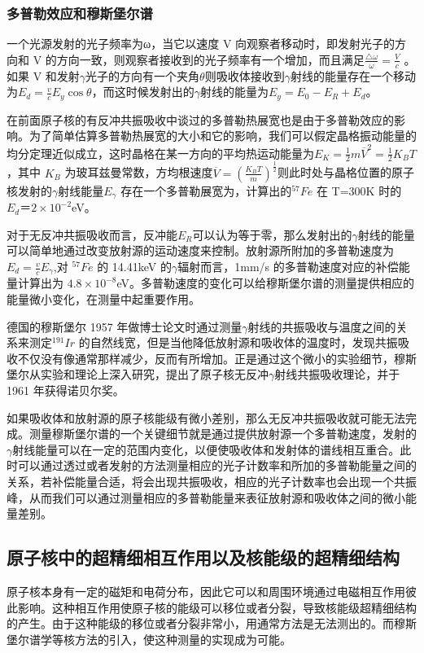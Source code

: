 \documentclass[hyperref]{ctexart}
\begin{document}
\begin{multicols}{2}
	\subsubsection{多普勒效应和穆斯堡尔谱}
	一个光源发射的光子频率为ω，当它以速度 V 向观察者移动时，即发射光子的方向和 V 的方向一致，则观察者接收到的光子频率有一个增加，而且满足$\frac{\triangle \omega}{\omega}=\frac{V}{c}$ 。如果 V 和发射$\gamma$光子的方向有一个夹角$\theta$则吸收体接收到$\gamma$射线的能量存在一个移动为$E_d=\frac{v}{c}E_y\cos{\theta}$，而这时候发射出的$\gamma$射线的能量为$E_y=E_0-E_R+E_d$。

	在前面原子核的有反冲共振吸收中谈过的多普勒热展宽也是由于多普勒效应的影响。为了简单估算多普勒热展宽的大小和它的影响，我们可以假定晶格振动能量的均分定理近似成立，这时晶格在某一方向的平均热运动能量为$E_K=\frac{1}{2}m{\overline{V}}^2=\frac{1}{2}K_BT$，其中 $K_B$ 为玻耳兹曼常数，方均根速度$\overline{V}=(\frac{K_BT}{m})^{\frac 1 2}$则此时处与晶格位置的原子核发射的$\gamma$射线能量$E_\gamma$ 存在一个多普勒展宽为，计算出的$^{57}Fe$ 在 T=300K 时的$E_d ＝2\times{10}^{-2}$eV。

	对于无反冲共振吸收而言，反冲能$E_R$可以认为等于零，那么发射出的$\gamma$射线的能量可以简单地通过改变放射源的运动速度来控制。放射源所附加的多普勒速度为$E_d =
\frac{v}{c}E_\gamma$,对 $^{57}Fe$ 的 14.41keV 的$\gamma$辐射而言，1mm/s 的多普勒速度对应的补偿能量计算出为 $4.8\times{10}^{-8}$eV。多普勒速度的变化可以给穆斯堡尔谱的测量提供相应的能量微小变化，在测量中起重要作用。

	德国的穆斯堡尔 1957 年做博士论文时通过测量$\gamma$射线的共振吸收与温度之间的关系来测定$^{191}Ir$ 的自然线宽，但是当他降低放射源和吸收体的温度时，发现共振吸收不仅没有像通常那样减少，反而有所增加。正是通过这个微小的实验细节，穆斯堡尔从实验和理论上深入研究，提出了原子核无反冲$\gamma$射线共振吸收理论，并于 1961 年获得诺贝尔奖。

	如果吸收体和放射源的原子核能级有微小差别，那么无反冲共振吸收就可能无法完成。测量穆斯堡尔谱的一个关键细节就是通过提供放射源一个多普勒速度，发射的$\gamma$射线能量可以在一定的范围内变化，以便使吸收体和发射体的谱线相互重合。此时可以通过透过或者发射的方法测量相应的光子计数率和所加的多普勒能量之间的关系，若补偿能量合适，将会出现共振吸收，相应的光子计数率也会出现一个共振峰，从而我们可以通过测量相应的多普勒能量来表征放射源和吸收体之间的微小能量差别。

	\subsection{原子核中的超精细相互作用以及核能级的超精细结构}
	原子核本身有一定的磁矩和电荷分布，因此它可以和周围环境通过电磁相互作用彼此影响。这种相互作用使原子核的能级可以移位或者分裂，导致核能级超精细结构的产生。由于这种能级的移位或者分裂非常小，用通常方法是无法测出的。而穆斯堡尔谱学等核方法的引入，使这种测量的实现成为可能。


\end{multicols}
\end{document}

